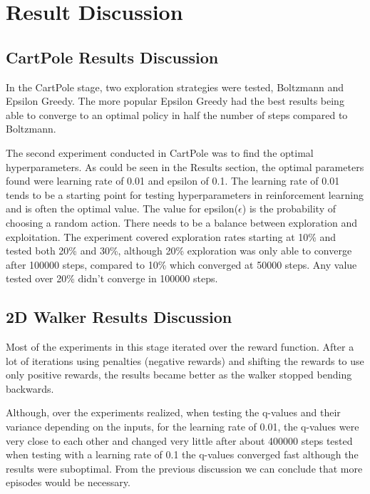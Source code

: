 \chapter{Result Discussion}

\section{CartPole Results Discussion}
In the CartPole stage, two exploration strategies were tested, Boltzmann and Epsilon Greedy. The more popular Epsilon Greedy had the best results being able to converge to an optimal policy in half the number of steps compared to Boltzmann.

The second experiment conducted in CartPole was to find the optimal hyperparameters. As could be seen in the Results section, the optimal parameters found were learning rate of 0.01 and epsilon of 0.1. The learning rate of 0.01 tends to be a starting point for testing hyperparameters in reinforcement learning and is often the optimal value. 
The value for epsilon($\epsilon$) is the probability of choosing a random action. There needs to be a balance between exploration and exploitation. The experiment covered exploration rates starting at 10\% and tested both 20\% and 30\%, although 20\% exploration was only able to converge after 100000 steps, compared to 10\% which converged at 50000 steps. Any value tested over 20\% didn't converge in 100000 steps.

\section{2D Walker Results Discussion}

 Most of the experiments in this stage iterated over the reward function. After a lot of iterations using penalties (negative rewards) and shifting the rewards to use only positive rewards, the results became better as the walker stopped bending backwards.

 Although, over the experiments realized, when testing the q-values and their variance depending on the inputs, for the learning rate of 0.01, the q-values were very close to each other and changed very little after about 400000 steps tested when testing with a learning rate of 0.1 the q-values converged fast although the results were suboptimal. From the previous discussion we can conclude that more episodes would be necessary.
 